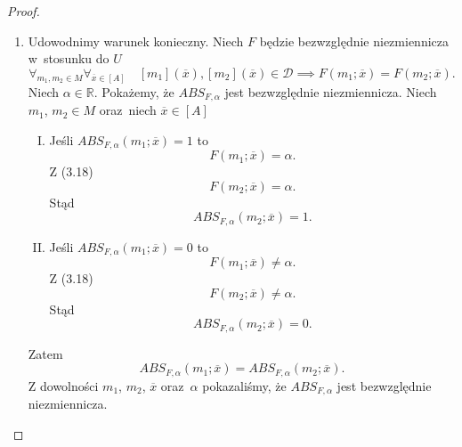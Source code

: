 \documentclass[12pt,a4paper]{report}
\newcommand{\domkniecie}[1]{\left[ {#1} \right] }
\begin{document}
\begin{proof}
\begin{enumerate}
\item
Udowodnimy warunek konieczny.
Niech $F$ będzie bezwzględnie niezmiennicza w~stosunku do $U$ 
\begin{equation}
\forall_{m_{1}, m_{2} \in M}  \forall_{\overline{x} \in \domkniecie{A}} \quad \domkniecie{m_1}(\overline{x}), \domkniecie{m_2}(\overline{x})\in \mathcal{D} \implies F(m_{1};\overline{x})=F(m_{2};\overline{x}).
\end{equation}
Niech $\alpha \in \mathbb{R}$. Pokażemy, że $ABS_{F,\alpha}$ jest bezwzględnie niezmiennicza. Niech $m_1$, $m_2 \in M$ oraz~niech $\overline{x} \in \domkniecie{A}$ 
\begin{enumerate}[I.]
\item
Jeśli $ABS_{F,\alpha}(m_1;\overline{x})=1$ to 
$$
F(m_1;\overline{x})=\alpha.
$$ 
Z (3.18) 
$$
F(m_2;\overline{x})=\alpha.
$$
Stąd 
$$
ABS_{F,\alpha}(m_2;\overline{x})=1.
$$
\item
Jeśli $ABS_{F,\alpha}(m_1;\overline{x})=0$ to 
$$
F(m_1;\overline{x})\ne \alpha.
$$
Z (3.18) 
$$
F(m_2;\overline{x})\ne\alpha.
$$
Stąd 
$$
ABS_{F,\alpha}(m_2;\overline{x})=0.
$$
\end{enumerate}
Zatem 
$$
ABS_{F,\alpha}(m_1;\overline{x})=ABS_{F,\alpha}(m_2;\overline{x}).
$$
Z dowolności $m_1$, $m_2$, $\overline{x}$ oraz~$\alpha$ pokazaliśmy, że $ABS_{F,\alpha}$ jest bezwzględnie niezmiennicza.


\end{enumerate}
\end{proof}
\end{document}
